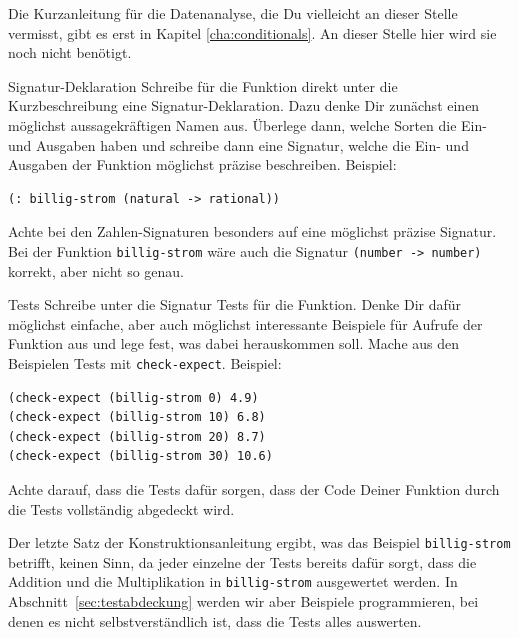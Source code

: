 Die Kurzanleitung für die Datenanalyse, die Du vielleicht an dieser
Stelle vermisst, gibt es erst in Kapitel \ref{cha:conditionals}. An
dieser Stelle hier wird sie noch nicht benötigt.

\begin{konstruktionsanleitung}{Signatur-Deklaration}
  \label{ka:signatur-deklaration}
  Schreibe für die Funktion direkt unter die Kurzbeschreibung eine
  Signatur-Deklaration.  Dazu denke Dir zunächst einen möglichst
  aussagekräftigen Namen aus.  Überlege dann, welche Sorten die Ein-
  und Ausgaben haben und schreibe dann eine Signatur, welche die Ein-
  und Ausgaben der Funktion möglichst präzise beschreiben.  Beispiel:
  \begin{lstlisting}
(: billig-strom (natural -> rational))
\end{lstlisting}
  Achte bei den Zahlen-Signaturen besonders auf eine möglichst präzise
  Signatur.  Bei der Funktion \lstinline{billig-strom} wäre auch die Signatur
  \lstinline{(number -> number)} korrekt, aber nicht so genau.
\end{konstruktionsanleitung}

\begin{konstruktionsanleitung}{Tests}
  \label{ka:tests}
  Schreibe unter die Signatur Tests für die Funktion.  Denke Dir dafür
  möglichst einfache, aber auch möglichst interessante
  Beispiele für Aufrufe der Funktion aus und lege fest, was dabei
  herauskommen soll.  Mache aus den Beispielen Tests mit
  \lstinline{check-expect}.  Beispiel:
\begin{lstlisting}
(check-expect (billig-strom 0) 4.9)
(check-expect (billig-strom 10) 6.8)
(check-expect (billig-strom 20) 8.7)
(check-expect (billig-strom 30) 10.6)
\end{lstlisting}
  Achte darauf, dass die Tests dafür sorgen, dass der Code Deiner
  Funktion durch die Tests vollständig abgedeckt wird.
\end{konstruktionsanleitung}
%
Der letzte Satz der Konstruktionsanleitung ergibt, was das Beispiel
\lstinline{billig-strom} betrifft, keinen Sinn, da jeder einzelne der
Tests bereits dafür
sorgt, dass die Addition und die Multiplikation in
\lstinline{billig-strom} ausgewertet werden.  In
Abschnitt~\ref{sec:testabdeckung} werden wir aber Beispiele
programmieren, bei denen es nicht selbstverständlich ist, dass die
Tests alles auswerten.

